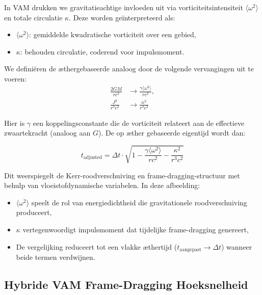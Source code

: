 In VAM drukken we gravitatieachtige invloeden uit via vorticiteitsintensiteit $\langle \omega^2 \rangle$ en totale circulatie $\kappa$. Deze worden geïnterpreteerd als:
\begin{itemize}
\item $\langle \omega^2 \rangle$: gemiddelde kwadratische vorticiteit over een gebied,
\item $\kappa$: behouden circulatie, coderend voor impulsmoment.
\end{itemize}

We definiëren de æthergebaseerde analoog door de volgende vervangingen uit te voeren:
\begin{equation}
\begin{aligned}
\frac{2GM}{rc^2} &\rightarrow \frac{\gamma \langle \omega^2 \rangle}{rc^2}, \\
\frac{J^2}{r^3c^2} &\rightarrow \frac{\kappa^2}{r^3c^2}
\end{aligned}
\label{eq:Kerr_replacements}
\end{equation}

Hier is $\gamma$ een koppelingsconstante die de vorticiteit relateert aan de effectieve zwaartekracht (analoog aan $G$). De op æther gebaseerde eigentijd wordt dan:

\begin{equation}
\boxed{t_\text{adjusted} = \Delta t \cdot \sqrt{1 - \frac{\gamma \langle \omega^2 \rangle}{rc^2} - \frac{\kappa^2}{r^3c^2}}}
\label{eq:Kerr_time_dilation_ae}
\end{equation}

Dit weerspiegelt de Kerr-roodverschuiving en frame-dragging-structuur met behulp van vloeistofdynamische variabelen. In deze afbeelding:
\begin{itemize}
\item $\langle \omega^2 \rangle$ speelt de rol van energiedichtheid die gravitationele roodverschuiving produceert,
\item $\kappa$ vertegenwoordigt impulsmoment dat tijdelijke frame-dragging genereert,
\item De vergelijking reduceert tot een vlakke æthertijd ($t_\text{aangepast} \to \Delta t$) wanneer beide termen verdwijnen.
\end{itemize}


\subsection*{Hybride VAM Frame-Dragging Hoeksnelheid}


